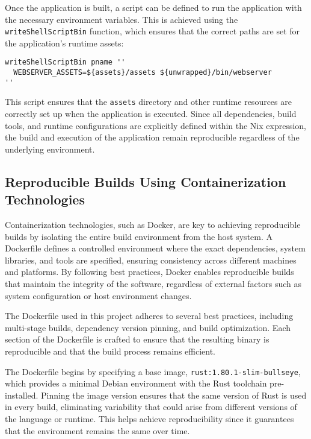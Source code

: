Once the application is built, a script can be defined to run the application
with the necessary environment variables. This is achieved using the
\texttt{writeShellScriptBin} function, which ensures that the correct paths
are set for the application’s runtime assets:

\begin{lstlisting}[caption={Generating the run script in Nix}]
writeShellScriptBin pname ''
  WEBSERVER_ASSETS=${assets}/assets ${unwrapped}/bin/webserver
''
\end{lstlisting}

This script ensures that the \texttt{assets} directory and other runtime resources
are correctly set up when the application is executed. Since all dependencies,
build tools, and runtime configurations are explicitly defined within the Nix
expression, the build and execution of the application remain reproducible
regardless of the underlying environment.

\subsection{Reproducible Builds Using Containerization Technologies}

Containerization technologies, such as Docker, are key to achieving reproducible builds
by isolating the entire build environment from the host system. A Dockerfile defines
a controlled environment where the exact dependencies, system libraries, and tools
are specified, ensuring consistency across different machines and platforms. By
following best practices, Docker enables reproducible builds that maintain the integrity
of the software, regardless of external factors such as system configuration or host
environment changes.

The Dockerfile used in this project adheres to several best practices, including
multi-stage builds, dependency version pinning, and build optimization. Each section
of the Dockerfile is crafted to ensure that the resulting binary is reproducible and
that the build process remains efficient.

The Dockerfile begins by specifying a base image, \texttt{rust:1.80.1-slim-bullseye},
which provides a minimal Debian environment with the Rust toolchain pre-installed.
Pinning the image version ensures that the same version of Rust is used in every build,
eliminating variability that could arise from different versions of the language or
runtime. This helps achieve reproducibility since it guarantees that the environment
remains the same over time.


